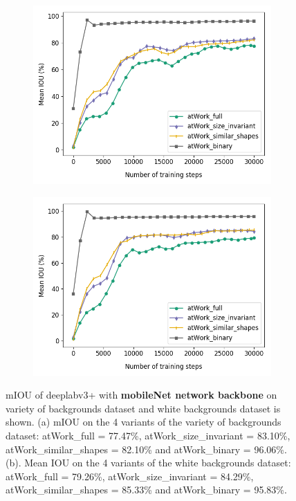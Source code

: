 	\begin{figure}
		\begin{subfigure}{.5\textwidth}
			\centering
			\includegraphics[width=1\linewidth]{images/mobi_4vars}
			\label{Fig:mobivarsa}
			\caption{}
		\end{subfigure}
		\begin{subfigure}{.5\textwidth}
			\centering
			\includegraphics[width=1\linewidth]{images/mobi_4vars_white}
			\label{Fig:mobivarsb}
			\caption{}
		\end{subfigure}
		\caption{mIOU of deeplabv3+ with \textbf{mobileNet network backbone} on variety of backgrounds dataset and white backgrounds dataset is shown. (a) mIOU on the 4 variants of the variety of backgrounds dataset: atWork\_full = 77.47\%, atWork\_size\_invariant = 83.10\%, atWork\_similar\_shapes = 82.10\% and atWork\_binary = 96.06\%. (b). Mean IOU on the 4 variants of the white backgrounds dataset: atWork\_full = 79.26\%, atWork\_size\_invariant = 84.29\%, atWork\_similar\_shapes = 85.33\% and atWork\_binary = 95.83\%.}
		\label{Fig:mobivars}
	\end{figure}
	
